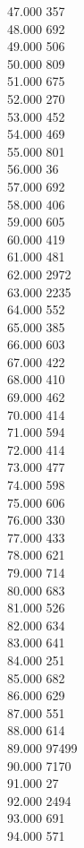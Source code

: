 { 47.000	357 \\
 48.000	692 \\
 49.000	506 \\
 50.000	809 \\
 51.000	675 \\
 52.000	270 \\
 53.000	452 \\
 54.000	469 \\
 55.000	801 \\
 56.000	36 \\
 57.000	692 \\
 58.000	406 \\
 59.000	605 \\
 60.000	419 \\
 61.000	481 \\
 62.000	2972 \\
 63.000	2235 \\
 64.000	552 \\
 65.000	385 \\
 66.000	603 \\
 67.000	422 \\
 68.000	410 \\
 69.000	462 \\
 70.000	414 \\
 71.000	594 \\
 72.000	414 \\
 73.000	477 \\
 74.000	598 \\
 75.000	606 \\
 76.000	330 \\
 77.000	433 \\
 78.000	621 \\
 79.000	714 \\
 80.000	683 \\
 81.000	526 \\
 82.000	634 \\
 83.000	641 \\
 84.000	251 \\
 85.000	682 \\
 86.000	629 \\
 87.000	551 \\
 88.000	614 \\
 89.000	97499 \\
 90.000	7170 \\
 91.000	27 \\
 92.000	2494 \\
 93.000	691 \\
 94.000	571 \\
}

